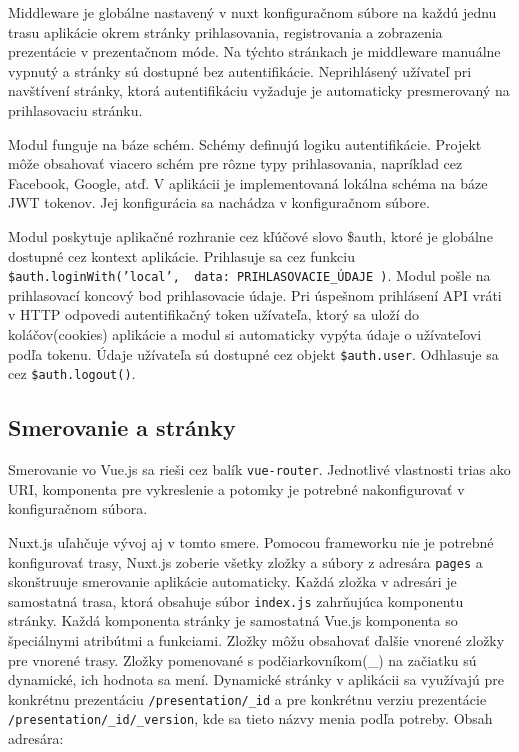 Middleware je globálne nastavený v nuxt konfiguračnom súbore na každú jednu trasu aplikácie okrem stránky prihlasovania, registrovania a zobrazenia prezentácie v prezentačnom móde. Na týchto stránkach je middleware manuálne vypnutý a stránky sú dostupné bez autentifikácie. Neprihlásený užívateľ pri navštívení stránky, ktorá autentifikáciu vyžaduje je automaticky presmerovaný na prihlasovaciu stránku.

Modul funguje na báze schém. Schémy definujú logiku autentifikácie. Projekt môže obsahovať viacero schém pre rôzne typy prihlasovania, napríklad cez Facebook, Google, atď. V aplikácii je implementovaná lokálna schéma na báze JWT tokenov. Jej konfigurácia sa nachádza v konfiguračnom súbore. 

Modul poskytuje aplikačné rozhranie cez kľúčové slovo \$auth, ktoré je globálne dostupné cez kontext aplikácie. Prihlasuje sa cez funkciu \texttt{\$auth.loginWith('local', { data: PRIHLASOVACIE\_ÚDAJE })}. Modul pošle na prihlasovací koncový bod prihlasovacie údaje. Pri úspešnom prihlásení API vráti v HTTP odpovedi autentifikačný token užívateľa, ktorý sa uloží do koláčov(cookies) aplikácie a modul si automaticky vypýta údaje o užívateľovi podľa tokenu. Údaje užívateľa sú dostupné cez objekt \texttt{\$auth.user}. Odhlasuje sa cez \texttt{\$auth.logout()}.

\subsection{Smerovanie a stránky}
Smerovanie vo Vue.js sa rieši cez balík \texttt{vue-router}. Jednotlivé vlastnosti trias ako URI, komponenta pre vykreslenie a  potomky je potrebné nakonfigurovať v konfiguračnom súbora. 

Nuxt.js uľahčuje vývoj aj v tomto smere. Pomocou frameworku nie je potrebné konfigurovať trasy, Nuxt.js zoberie všetky zložky a súbory z adresára \texttt{pages} a skonštruuje smerovanie aplikácie automaticky. Každá zložka v adresári je samostatná trasa, ktorá obsahuje súbor \texttt{index.js} zahrňujúca komponentu stránky. Každá komponenta stránky je samostatná Vue.js komponenta so špeciálnymi atribútmi a funkciami. Zložky môžu obsahovať ďalšie vnorené zložky pre vnorené trasy. Zložky pomenované s podčiarkovníkom(\_) na začiatku sú dynamické, ich hodnota sa mení. Dynamické stránky v aplikácii sa využívajú pre konkrétnu prezentáciu \texttt{/presentation/\_id} a pre konkrétnu verziu prezentácie \texttt{/presentation/\_id/\_version}, kde sa tieto názvy menia podľa potreby. Obsah adresára:

